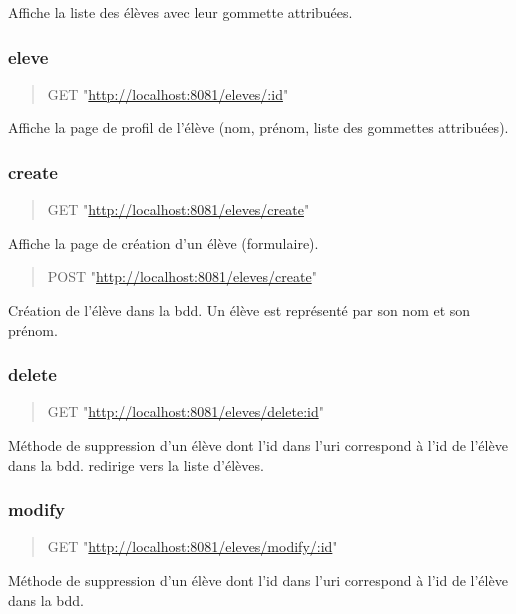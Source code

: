 \documentclass[11pt]{article}
\begin{document}
Affiche la liste des élèves avec leur gommette attribuées.

\subsubsection{eleve}
\label{sec:orgf405e2d}

\begin{quote}
GET "\url{http://localhost:8081/eleves/:id}"
\end{quote}

Affiche la page de profil de l'élève (nom, prénom, liste des gommettes attribuées).

\subsubsection{create}
\label{sec:org35c327a}

\begin{quote}
GET "\url{http://localhost:8081/eleves/create}"
\end{quote}

Affiche la page de création d'un élève (formulaire).

\begin{quote}
POST "\url{http://localhost:8081/eleves/create}"
\end{quote}

Création de l'élève dans la bdd. Un élève est représenté par son nom et son prénom.

\subsubsection{delete}
\label{sec:org7ca64c8}

\begin{quote}
GET "\url{http://localhost:8081/eleves/delete:id}"
\end{quote}

Méthode de suppression d'un élève dont l'id dans l'uri correspond à l'id de l'élève dans la bdd.
redirige vers la liste d'élèves.

\subsubsection{modify}
\label{sec:org562fc68}

\begin{quote}
GET "\url{http://localhost:8081/eleves/modify/:id}"
\end{quote}

Méthode de suppression d'un élève dont l'id dans l'uri correspond à l'id de l'élève dans la bdd.
\end{document}
